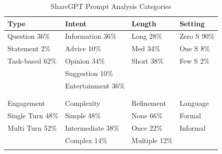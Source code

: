 \begin{table}[]
    \centering
    \caption{ShareGPT Prompt Analysis Categories}
    \begin{tabular}{@{}llll@{}}
        \toprule
        Type        & Intent        & Length              & Setting   \\ \midrule
        Question \hfill 36\%    & Information \hfill 36\%   & Long \hfill 28\%  & Zero
        S \hfill 90\% \\
        Statement \hfill 2\%    & Advice \hfill 10\%        & Med \hfill 34\% & One S \hfill 8\% \\
        Task-based \hfill 62\%  & Opinion \hfill 34\%       & Short \hfill 38\% & Few S \hfill 2\% \\
                                & Suggestion \hfill 10\%   &                    &           \\
                                & Entertainment \hfill 36\% &                    &           \\
                                &                           &                    &           \\
                                &                            &                    &           \\
        \toprule
        Engagement              & Complexity    & Refinement         & Language  \\ \midrule
        Single Turn \hfill 48\%  & Simple \hfill 48\%       & None     \hfill 66\%           &
        Formal    \\
        Multi Turn \hfill 52\%   & Intermediate \hfill 38\% & Once     \hfill 22\%          &
        Informal  \\
                                & Complex \hfill 14\%      & Multiple \hfill 12\%           &           \\ \\
        \bottomrule
    \end{tabular}
    \label{tab:sharegpt-prompt-analysis-categories}
\end{table}


